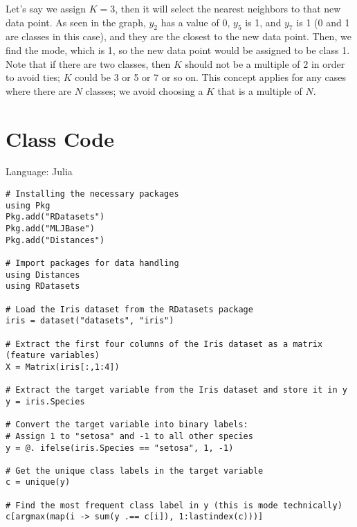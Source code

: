 Let's say we assign $K = 3$, then it will select the nearest neighbors to that new data point.
As seen in the graph, $y_2$ has a value of 0, $y_5$ is 1, and $y_7$ is 1 (0 and 1 are classes in this case), and
they are the closest to the new data point. Then, we find the mode, which is 1, so
the new data point would be assigned to be class 1.\\
Note that if there are two classes, then $K$ should not be a multiple of 2 in order to avoid ties; $K$ could be
3 or 5 or 7 or so on. This concept applies for any cases where there are $N$ classes; we avoid choosing a $K$ that is a multiple of $N$.

\section{Class Code}
Language: Julia
\begin{verbatim}
# Installing the necessary packages
using Pkg
Pkg.add("RDatasets")
Pkg.add("MLJBase")
Pkg.add("Distances")

# Import packages for data handling
using Distances
using RDatasets

# Load the Iris dataset from the RDatasets package
iris = dataset("datasets", "iris")

# Extract the first four columns of the Iris dataset as a matrix (feature variables)
X = Matrix(iris[:,1:4])

# Extract the target variable from the Iris dataset and store it in y
y = iris.Species

# Convert the target variable into binary labels:  
# Assign 1 to "setosa" and -1 to all other species  
y = @. ifelse(iris.Species == "setosa", 1, -1)

# Get the unique class labels in the target variable
c = unique(y)

# Find the most frequent class label in y (this is mode technically)
c[argmax(map(i -> sum(y .== c[i]), 1:lastindex(c)))]
\end{verbatim}

\newpage
